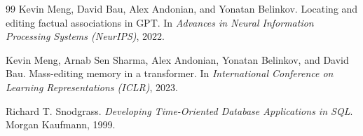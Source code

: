\documentclass[11pt,a4paper]{article}
\begin{document}
\begin{thebibliography}{99}
Kevin Meng, David Bau, Alex Andonian, and Yonatan Belinkov.
Locating and editing factual associations in GPT.
In \textit{Advances in Neural Information Processing Systems (NeurIPS)}, 2022.

Kevin Meng, Arnab Sen Sharma, Alex Andonian, Yonatan Belinkov, and David Bau.
Mass-editing memory in a transformer.
In \textit{International Conference on Learning Representations (ICLR)}, 2023.

Richard T. Snodgrass.
\textit{Developing Time-Oriented Database Applications in SQL}.
Morgan Kaufmann, 1999.

\end{thebibliography}
\end{document}
